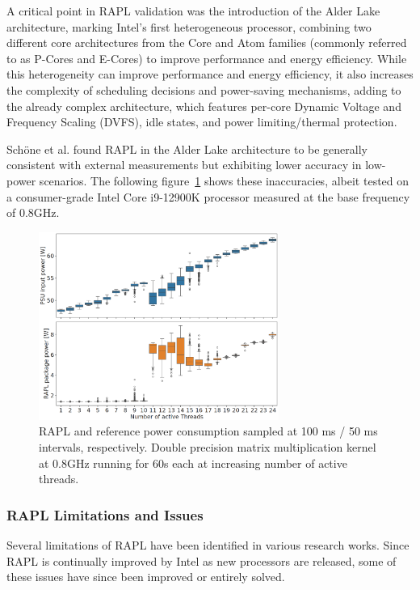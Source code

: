 A critical point in RAPL validation was the introduction of the Alder Lake architecture, marking Intel's first heterogeneous processor, combining two different core architectures from the Core and Atom families (commonly referred to as P-Cores and E-Cores) to improve performance and energy efficiency. While this heterogeneity can improve performance and energy efficiency, it also increases the complexity of scheduling decisions and power-saving mechanisms, adding to the already complex architecture, which features per-core Dynamic Voltage and Frequency Scaling (DVFS), idle states, and power limiting/thermal protection.

Schöne et al.\parencite{schone2024energy} found RAPL in the Alder Lake architecture to be generally consistent with external measurements but exhibiting lower accuracy in low-power scenarios. The following figure~\ref{fig:rapl_vs_PSU_validation} shows these inaccuracies, albeit tested on a consumer-grade Intel Core i9-12900K processor measured at the base frequency of 0.8GHz.

\begin{figure}[ht]
    \centering
    \includegraphics[width=0.7\textwidth]{Figures/rapl_vs_PSU_validation.png}
    \caption[RAPL validation: CPU vs. PSU]{RAPL and reference power consumption sampled at 100 ms / 50 ms intervals, respectively. Double precision matrix multiplication kernel at 0.8GHz running for 60s each at increasing number of active threads\parencite{schone2024energy}.}
    \label{fig:rapl_vs_PSU_validation}
\end{figure}

\subsubsection{RAPL Limitations and Issues}
\label{sec:rapllimitations}
Several limitations of RAPL have been identified in various research works. Since RAPL is continually improved by Intel as new processors are released, some of these issues have since been improved or entirely solved.

